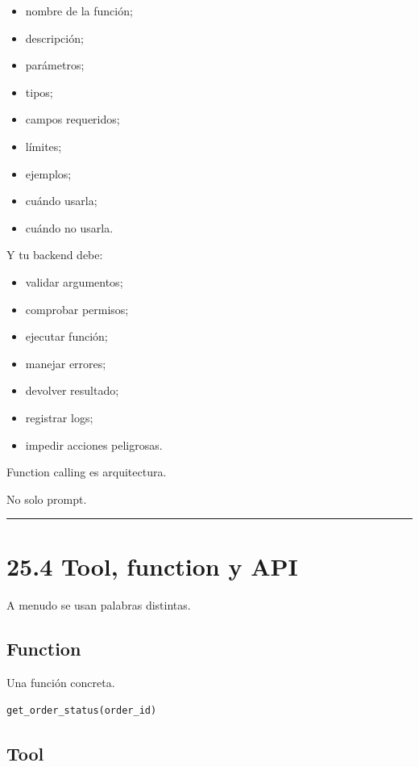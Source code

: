 \begin{itemize}
\tightlist
\item
  nombre de la función;
\item
  descripción;
\item
  parámetros;
\item
  tipos;
\item
  campos requeridos;
\item
  límites;
\item
  ejemplos;
\item
  cuándo usarla;
\item
  cuándo no usarla.
\end{itemize}

Y tu backend debe:

\begin{itemize}
\tightlist
\item
  validar argumentos;
\item
  comprobar permisos;
\item
  ejecutar función;
\item
  manejar errores;
\item
  devolver resultado;
\item
  registrar logs;
\item
  impedir acciones peligrosas.
\end{itemize}

Function calling es arquitectura.

No solo prompt.

\begin{center}\rule{0.5\linewidth}{0.5pt}\end{center}

\section{25.4 Tool, function y API}\label{tool-function-y-api}

A menudo se usan palabras distintas.

\subsection{Function}\label{function}

Una función concreta.

\begin{lstlisting}
get_order_status(order_id)
\end{lstlisting}

\subsection{Tool}\label{tool}

